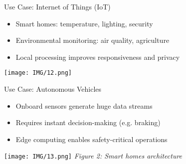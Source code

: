 \documentclass{beamer}
\begin{document}
\begin{frame}{Use Case: Internet of Things (IoT)}
  \begin{itemize}
    \item Smart homes: temperature, lighting, security
    \item Environmental monitoring: air quality, agriculture
    \item Local processing improves responsiveness and privacy
  \end{itemize}
  \vspace{0.5cm}
  \centering
  \texttt{[image: IMG/12.png]} %
\end{frame}

\begin{frame}{Use Case: Autonomous Vehicles}
  \begin{itemize}
    \item Onboard sensors generate huge data streams
    \item Requires instant decision-making (e.g. braking)
    \item Edge computing enables safety-critical operations
  \end{itemize}
  \vspace{0.2cm}
  \centering
  \texttt{[image: IMG/13.png]} %
  \vspace{0.2cm}
  \small \textit{Figure 2: Smart homes architecture}
\end{frame}
\end{document}
